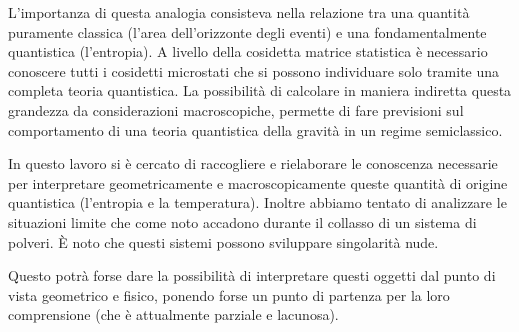 \par
L'importanza di questa analogia consisteva nella relazione tra una quantit\`a pu\-ra\-men\-te classica (l'area dell'orizzonte degli eventi) e una fondamentalmente quantistica (l'en\-tro\-pia). A livello della cosidetta matrice statistica \`e necessario conoscere tutti i cosidetti microstati che si possono individuare solo tramite una completa teoria quantistica. La possibilit\`a di calcolare in maniera indiretta questa grandezza da considerazioni macroscopiche, permette di fare previsioni sul comportamento di una teoria  quantistica della gravit\`a in un regime semiclassico.
\par
In questo lavoro si \`e cercato di raccogliere e rielaborare le conoscenza necessarie per interpretare geometricamente e macroscopicamente queste quantit\`a di origine quantistica (l'entropia e la temperatura). Inoltre abbiamo tentato di analizzare le situazioni limite che come noto accadono durante il collasso di un sistema di polveri. \`E noto che questi sistemi possono sviluppare singolarit\`a nude.\par
Questo potr\`a forse dare la possibilit\`a di interpretare questi oggetti dal punto di vista geometrico e fisico, ponendo forse un punto di partenza per la loro comprensione (che \`e attualmente parziale e lacunosa).